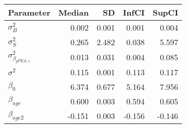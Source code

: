 \begin{table}[ht]
\centering
\begin{tabular}{lrrrr}
  \hline
Parameter & Median & SD & InfCI & SupCI \\ 
  \hline
$\sigma^{2}_{B}$ & 0.002 & 0.001 & 0.001 & 0.004 \\ 
  $\sigma^{2}_{S}$ & 0.265 & 2.482 & 0.038 & 5.597 \\ 
  $\sigma^{2}_{\beta_{gPEA,s}}$ & 0.013 & 0.031 & 0.004 & 0.085 \\ 
  $\sigma^{2}$ & 0.115 & 0.001 & 0.113 & 0.117 \\ 
  $\beta_{0}$ & 6.374 & 0.677 & 5.164 & 7.956 \\ 
  $\beta_{age}$ & 0.600 & 0.003 & 0.594 & 0.605 \\ 
  $\beta_{age2}$ & -0.151 & 0.003 & -0.156 & -0.146 \\ 
   \hline
\end{tabular}
\end{table}
